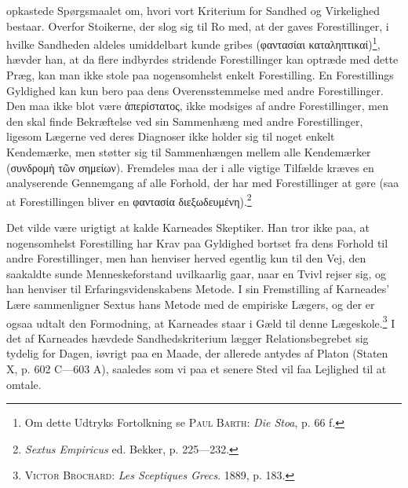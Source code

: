 \documentclass[12pt]{article}
\newcommand{\opage}[1]{\marginnote{\footnotesize\textit{[#1]}}}
\begin{document}
opkastede Spørgsmaalet om, hvori vort Kriterium for Sandhed og Virkelighed
bestaar. Overfor Stoikerne, der slog sig til Ro med, at der gaves
Forestillinger, i hvilke Sandheden aldeles umiddelbart kunde gribes
(φαντασίαι καταληπτικαί)\footnote{Om dette Udtryks Fortolkning se
\textsc{Paul Barth}: \textit{Die Stoa}, p. 66 f.}, hævder han, at da flere
indbyrdes stridende Forestillinger kan optræde med dette Præg, kan man ikke
stole paa nogensomhelst enkelt Forestilling. En Forestillings Gyldighed kan
kun bero paa dens Overensstemmelse med andre Forestillinger. Den maa ikke blot
være ἀπερίστατος, ikke modsiges af andre Forestillinger, men den skal finde
Bekræftelse ved sin Sammenhæng med andre Forestillinger, ligesom Lægerne
\opage{7} \setcounter{footnote}{0}
ved deres Diagnoser ikke holder sig til noget enkelt Kendemærke, men støtter
sig til Sammenhængen mellem alle Kendemærker (συνδρομὴ τῶν σημείων).
Fremdeles maa der i alle vigtige Tilfælde kræves en \guillemotright analyserende
Gennemgang\guillemotleft{} af alle Forhold, der har med Forestillinger at
gøre (saa at Forestillingen bliver en φαντασία
διεξωδευμένη).\footnote{\textit{Sextus Empiricus} ed. Bekker, p. 225---232.}

Det vilde være urigtigt at kalde Karneades Skeptiker. Han tror ikke paa, at
nogensomhelst Forestilling har Krav paa Gyldighed bortset fra dens Forhold til
andre Forestillinger, men han henviser herved egentlig kun til den Vej, den
saakaldte sunde Menneskeforstand uvilkaarlig gaar, naar en Tvivl rejser sig,
og han henviser til Erfaringsvidenskabens Metode. I sin Fremstilling af
Karneades' Lære sammenligner Sextus hans Metode med de empiriske Lægers, og
der er ogsaa udtalt den Formodning, at Karneades staar i Gæld til denne
Lægeskole.\footnote{\textsc{Victor Brochard}: \textit{Les Sceptiques Grecs}.
1889, p. 183.} I det af Karneades hævdede Sandhedskriterium lægger
Relationsbegrebet sig tydelig for Dagen, iøvrigt paa en Maade, der allerede
antydes af Platon (Staten X, p. 602 C---603 A), saaledes som vi paa et senere
Sted vil faa Lejlighed til at omtale.
\end{document}
